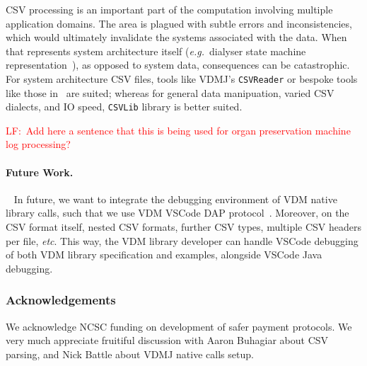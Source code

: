\documentclass[runningheads,a4paper]{llncs}
\newcommand{\lfcomment}[1]{{\scriptsize\textcolor{red}{LF:~#1}}}  %
\begin{document}
CSV processing is an important part of the computation involving multiple application domains. The area is plagued with subtle errors and inconsistencies, which would ultimately invalidate the systems associated with the data. When that represents system architecture itself (\textit{e.g.}~dialyser state machine representation~\cite{scp-dialyser}), as opposed to system data, consequences can be catastrophic. For system architecture CSV files, tools like VDMJ's \texttt{CSVReader} or bespoke tools like those in~\cite{egleUG,alastairMSc,emv2} are suited; whereas for general data manipuation, varied CSV dialects, and IO speed, \texttt{CSVLib} library is better suited.     

\lfcomment{Add here a sentence that this is being used for organ preservation machine log processing?}

\paragraph*{Future Work.}~
%
In future, we want to integrate the debugging environment of VDM native library calls, such that we use VDM VSCode DAP protocol~\cite{AdvancedVSCodePaper}. Moreover, on the CSV format itself, nested CSV formats, further CSV types, multiple CSV headers per file, \textit{etc}. This way, the VDM library developer can handle VSCode debugging of both VDM library specification and examples, alongside VSCode Java debugging. 

\subsubsection*{Acknowledgements}
We acknowledge NCSC funding on development of safer payment protocols. We very much appreciate fruitiful discussion with Aaron Buhagiar about CSV parsing, and Nick Battle about VDMJ native calls setup. 




\end{document}
